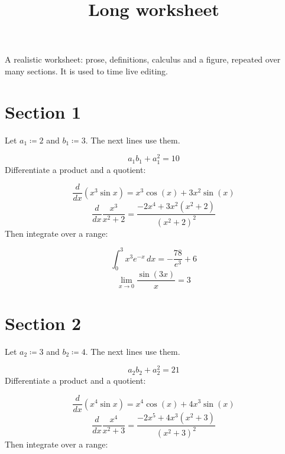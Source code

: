 \documentclass[11pt,a4paper]{article}
\title{Long worksheet}
\date{}
\theoremstyle{plain}
\theoremstyle{definition}
\theoremstyle{remark}
\begin{document}
\maketitle
A realistic worksheet: prose, definitions, calculus and a figure, repeated over many sections. It is used to time live editing.

\section*{Section 1}

Let $a_{1} \coloneqq  2$ and $b_{1} \coloneqq  3$. The next lines use them.

\begin{equation*}
  a_{1} b_{1} + a_{1}^2 = 10
\end{equation*}
Differentiate a product and a quotient:

\begin{equation*}
  \frac{d}{dx} \left( x^{3} \sin x \right) = x^{3} \cos\left(x\right) + 3 x^{2} \sin\left(x\right)
\end{equation*}
\begin{equation*}
  \frac{d}{dx} \frac{x^{3}}{x^2 + 2} = \frac{-2 x^{4} + 3 x^{2} \left(x^{2} + 2\right)}{\left(x^{2} + 2\right)^{2}}
\end{equation*}
Then integrate over a range:

\begin{equation*}
  \int_0^{3} x^{3} e^{-x} \, dx = -\frac{78}{e^{3}} + 6
\end{equation*}
\begin{equation*}
  \lim_{x \to 0} \frac{\sin(3 x)}{x} = 3
\end{equation*}
\section*{Section 2}

Let $a_{2} \coloneqq  3$ and $b_{2} \coloneqq  4$. The next lines use them.

\begin{equation*}
  a_{2} b_{2} + a_{2}^2 = 21
\end{equation*}
Differentiate a product and a quotient:

\begin{equation*}
  \frac{d}{dx} \left( x^{4} \sin x \right) = x^{4} \cos\left(x\right) + 4 x^{3} \sin\left(x\right)
\end{equation*}
\begin{equation*}
  \frac{d}{dx} \frac{x^{4}}{x^2 + 3} = \frac{-2 x^{5} + 4 x^{3} \left(x^{2} + 3\right)}{\left(x^{2} + 3\right)^{2}}
\end{equation*}
Then integrate over a range:
\end{document}
